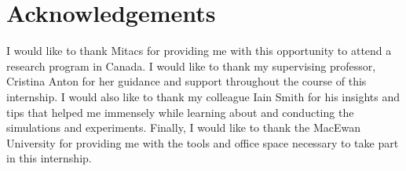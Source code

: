 \documentclass[]{article}
\begin{document}
\section{Acknowledgements}
I would like to thank Mitacs for providing me with this opportunity to attend a research program in Canada. I would like to thank my supervising professor, Cristina Anton for her guidance and support throughout the course of this internship. I would also like to thank my colleague Iain Smith for his insights and tips that helped me immensely while learning about and conducting the simulations and experiments. Finally, I would like to thank the MacEwan University for providing me with the tools and office space necessary to take part in this internship.
\end{document}
